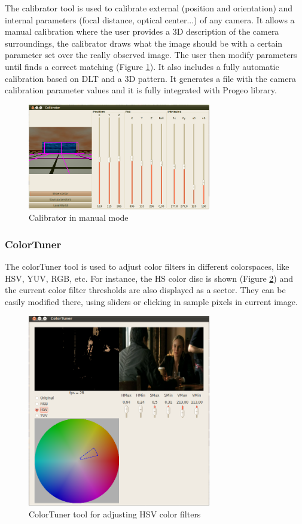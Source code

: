 \documentclass[twocolumn]{svjour3}          %
\begin{document}
The calibrator tool is used to calibrate external (position and orientation) and internal parameters (focal distance, optical center...) of any camera. It allows a manual calibration where the user provides a 3D description of the camera surroundings, the calibrator draws what the image should be with a certain parameter set over the really observed image. The user then modify parameters until finds a correct matching (Figure \ref{fig:calibrator}). It also includes a fully automatic calibration based on DLT and a 3D pattern. It generates a file with the camera calibration parameter values and it is fully integrated with Progeo library.

\begin{figure}[h!]
  \includegraphics[width=8cm]{figs/calibratorGUI.png}
\caption{Calibrator in manual mode}
\label{fig:calibrator}
\end{figure}

\subsubsection{ColorTuner}

The colorTuner tool is used to adjust color filters in different colorspaces, like HSV, YUV, RGB, etc. For instance, the HS color disc is shown (Figure \ref{fig:colortuner}) and the current color filter thresholds are also displayed as a sector. They can be easily modified there, using sliders or clicking in sample pixels in current image.

\begin{figure}[h!]
  \includegraphics[width=8cm]{figs/colorTunerHSV.png}
\caption{ColorTuner tool for adjusting HSV color filters}
\label{fig:colortuner}
\end{figure}
\end{document}
